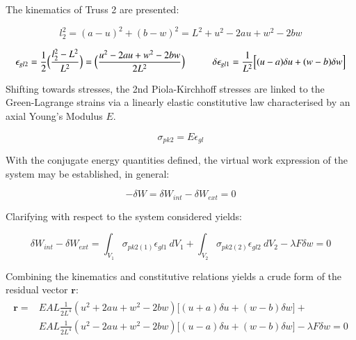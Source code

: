 The kinematics of Truss 2 are presented:

\begin{equation} 
l_2^2 = (a-u)^2 + (b-w)^2 = L^2 + u^2 - 2au +w^2 -2bw
\label{eqapp0_2_1}
\end{equation}

\begin{equation} 
\epsilon_{gl2} = \frac{1}{2}
\Big(\frac{l_2^2-L^2}{L^2}\Big)
=
\Big(\frac{u^2 - 2au +w^2 -2bw}{2L^2}\Big)
\hspace{10mm}
\delta\epsilon_{gl1} = 
\frac{1}{L^2}
\Big[
(u-a)\delta u
+
(w-b)\delta w
\Big]
\label{eqapp0_2_2}
\end{equation}

Shifting towards stresses, the 2nd Piola-Kirchhoff stresses are linked to the Green-Lagrange strains via a linearly elastic constitutive law characterised by an axial Young's Modulus $E$.

\begin{equation} 
\sigma_{pk2} = E \epsilon_{gl}
\label{eqapp0_3}
\end{equation}

With the conjugate energy quantities defined, the virtual work expression of the system may be established, in general:

\begin{equation} 
-\delta W = \delta W_{int} - \delta W_{ext} = 0
\label{eqapp0_4}
\end{equation}

Clarifying with respect to the system considered yields:

\begin{equation} 
\delta W_{int} - \delta W_{ext} = 
\int_{V_1} \sigma_{pk2(1)} \epsilon_{gl1}
\ dV_1
+
\int_{V_2} \sigma_{pk2(2)} \epsilon_{gl2}
\ dV_2
- \lambda F \delta w = 0
\label{eqapp0_5}
\end{equation}

Combining the kinematics and constitutive relations yields a crude form of the residual vector $\mathbf{r}$:
\begin{gather} 
	\begin{aligned}
		\mathbf{r} = 
		&EAL
		\frac{1}{2L^4}
		(u^2 + 2au +w^2 -2bw)
		\Big[
		(u+a)\delta u
		+
		(w-b)\delta w
		\Big] +
		\\
		&EAL
		\frac{1}{2L^4}
		(u^2 - 2au +w^2 -2bw)
		\Big[
		(u-a)\delta u
		+
		(w-b)\delta w
		\Big] 
		- \lambda F \delta w = 0
		\label{eqapp0_6_0}
	\end{aligned}
\end{gather}

